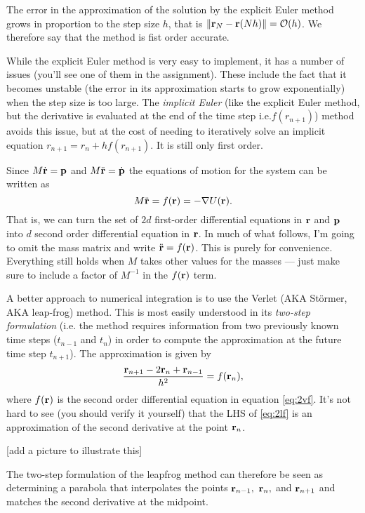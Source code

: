 \documentclass{article}
\begin{document}
The error in the approximation of the solution by the explicit Euler method grows in proportion to the step size $h$, that is $\|{\bf r}_N-{\bf r}(Nh)\|=\mathcal{O}(h)$. We therefore say that the method is fist order accurate.

While the explicit Euler method is very easy to implement, it has a number of issues (you'll see one of them in the assignment). These include the fact that it becomes unstable (the error in its approximation starts to grow exponentially) when the step size is too large. The \emph{implicit Euler} (like the explicit Euler method, but the derivative is evaluated at the end of the time step i.e.$f(r_{n+1})$) method avoids this issue, but at the cost of needing to iteratively solve an implicit equation $r_{n+1}=r_n+hf(r_{n+1})$. It is still only first order.

Since $M\dot{\bf r} = {\bf p}$ and $M\ddot{\bf r} = \dot{\bf p}$ the equations of motion for the system can be written as
\begin{equation}
	M\ddot{\bf r} = f({\bf r}) = -\nabla U({\bf r}).
	\label{eq:2vf}
\end{equation}
That is, we can turn the set of $2d$ first-order differential equations in ${\bf r}$ and ${\bf p}$ into $d$ second order differential equation in ${\bf r}$.
In much of what follows, I'm going to omit the mass matrix and write $\ddot{\bf r} = f({\bf r})$. This is purely for convenience. Everything still holds when $M$ takes other values for the masses --- just make sure to include a factor of $M^{-1}$ in the $f({\bf r})$ term.

A better approach to numerical integration is to use the Verlet (AKA St\"{o}rmer, AKA leap-frog) method. This is most easily understood in its \emph{two-step formulation} (i.e. the method requires information from two previously known time steps ($t_{n-1}$ and $t_n$) in order to compute the approximation at the future time step $t_{n+1}$). The approximation is given by 
\begin{equation}
	\frac{{\bf r}_{n+1} - 2{\bf r}_n + {\bf r}_{n-1}}{h^2} = f({\bf r}_n),
	\label{eq:2lf}
\end{equation}
where $f({\bf r})$ is the second order differential equation in equation \ref{eq:2vf}. It's not hard to see (you should verify it yourself) that the LHS of \ref{eq:2lf} is an approximation of the second derivative at the point ${\bf r}_n$.

[add a picture to illustrate this]

The two-step formulation of the leapfrog method can therefore be seen as determining a parabola that interpolates the points ${\bf r}_{n-1},~{\bf r}_{n},$ and ${\bf r}_{n+1}$ and matches the second derivative at the midpoint.
\end{document}
